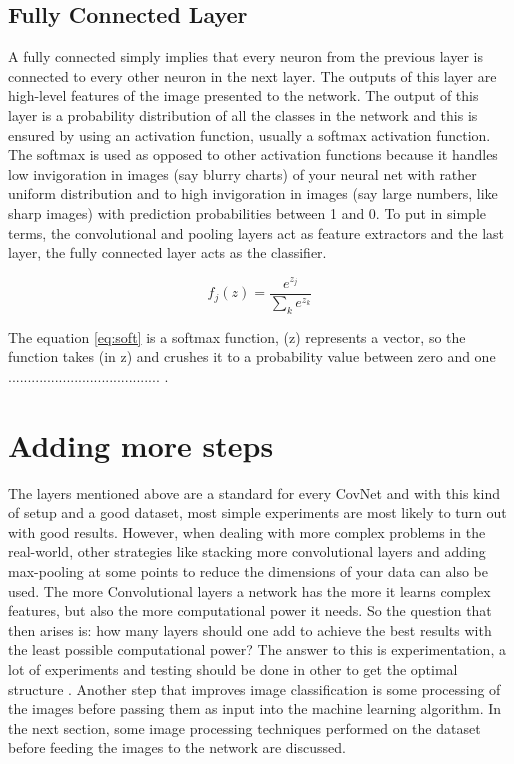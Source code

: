 \documentclass[12pt, a4paper,oneside]{report}
\begin{document}
\subsection{Fully Connected Layer}
A fully connected simply implies that every neuron from the previous layer is connected to every other neuron in the next layer. The outputs of this layer are high-level features of the image presented to the network. The output of this layer is a probability distribution of all the classes in the network and this is ensured by using an activation function, usually a softmax activation function. The softmax is used as opposed to other activation functions because it handles low invigoration in images (say blurry charts) of your neural net with rather uniform distribution and to high invigoration in images (say large numbers, like sharp images) with prediction probabilities between 1 and 0. To put in simple terms, the convolutional and pooling layers act as feature extractors and the last layer, the fully connected layer acts as the classifier.

\begin{equation} \label{eq:soft}
f_j(z) = \frac{e^{z_j}}{\sum_k e^{z_k}}
\end{equation}

The equation \ref{eq:soft} is a softmax function, (z) represents a vector, so the function takes (in z) and crushes it to a probability value between zero and one
....................................... \cite{softmax}.

\section{Adding more steps}
The layers mentioned above are a standard for every CovNet and with this kind of setup and a good dataset, most simple experiments are most likely to turn out with good results. However, when dealing with more complex problems in the real-world, other strategies like stacking more convolutional layers and adding max-pooling at some points to reduce the dimensions of your data can also be used. The more Convolutional layers a network has the more it learns complex features, but also the more computational power it needs. So the question that then arises is: how many layers should one add to achieve the best results with the least possible computational power? The answer to this is experimentation, a lot of experiments and testing should be done in other to get the optimal structure \cite{layers}. Another step that improves image classification is some processing of the images before passing them as input into the machine learning algorithm. In the next section, some image processing techniques performed on the dataset before feeding the images to the network are discussed.
\end{document}
